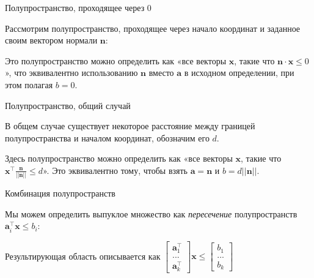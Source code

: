 \documentclass{beamer}
\begin{document}
\begin{frame}{Полупространство, проходящее через 0}
	\begin{flushleft}
		
		Рассмотрим полупространство, проходящее через начало координат и заданное своим вектором нормали $\mathbf{n}$:
		
		
		
		Это полупространство можно определить как «все векторы $\mathbf{x}$, такие что $\mathbf{n} \cdot \mathbf{x} \leq 0$», что эквивалентно использованию $\mathbf{n}$ вместо $\mathbf{a}$ в исходном определении, при этом полагая $b = 0$.
		
	\end{flushleft}
\end{frame}




\begin{frame}{Полупространство, общий случай}
	\begin{flushleft}
		
		В общем случае существует некоторое расстояние между границей полупространства и началом координат, обозначим его $d$.
		
		
		Здесь полупространство можно определить как «все векторы $\mathbf{x}$, такие что $\mathbf{x}^\top \frac{\mathbf{n}}{|| \mathbf{n} ||}  \leq d$». Это эквивалентно тому, чтобы взять $\mathbf{a} = \mathbf{n}$ и $b = d ||\mathbf{n}||$.
		
	\end{flushleft}
\end{frame}


\begin{frame}{Комбинация полупространств}
	\begin{flushleft}
		
		Мы можем определить выпуклое множество как \emph{пересечение} полупространств $\mathbf{a}_i^\top \mathbf{x} \leq b_i$:
		
		
		
		Результирующая область описывается как $\begin{bmatrix} \mathbf{a}_1^\top \\ ... \\ \mathbf{a}_k^\top \end{bmatrix} \mathbf{x} \leq \begin{bmatrix} b_1 \\ ... \\ b_k \end{bmatrix}$
		
		
	\end{flushleft}
\end{frame}
\end{document}
